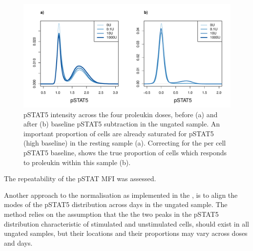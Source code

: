 \begin{figure}[h]
\centering
\includegraphics[scale=.5]{IL2/figures/pstat5-baseline-relative.pdf}
{ pSTAT5 intensity across the four proleukin doses, before (a) and after (b) baseline pSTAT5 subtraction in the ungated sample.}
{
  An important proportion of cells are already saturated for pSTAT5 (high baseline) in the resting sample (a).
  Correcting for the per cell pSTAT5 baseline, shows the true proportion of cells which responds to proleukin within this sample (b).
}
\end{figure}

The repeatability of the pSTAT MFI was assessed.  



Another approach to the normalisation as implemented in the , is to align the modes of the pSTAT5 distribution across days in the ungated sample.
The method relies on the assumption that the the two peaks in the pSTAT5 distribution characteristic of stimulated and unstimulated cells,
should exist in all ungated samples, but their locations and their proportions may vary across doses and days.



